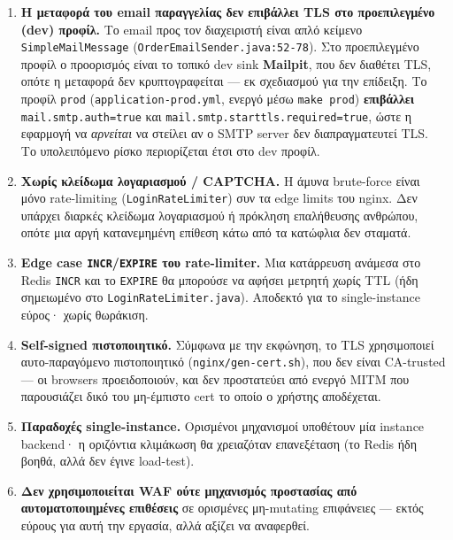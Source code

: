 \documentclass[11pt,a4paper]{article}
\newcommand{\code}[1]{\texttt{#1}}
\begin{document}
\begin{enumerate}[leftmargin=2em]\setlength\itemsep{3pt}
    \item \textbf{Η μεταφορά του email παραγγελίας δεν επιβάλλει TLS στο προεπιλεγμένο (dev) προφίλ.} Το
          email προς τον διαχειριστή είναι απλό κείμενο \code{SimpleMailMessage}
          (\code{OrderEmailSender.java:52-78}). Στο προεπιλεγμένο προφίλ ο προορισμός είναι το τοπικό
          dev sink \textbf{Mailpit}, που δεν διαθέτει TLS, οπότε η μεταφορά δεν κρυπτογραφείται ---
          εκ σχεδιασμού για την επίδειξη. Το προφίλ \code{prod} (\code{application-prod.yml}, ενεργό
          μέσω \code{make prod}) \textbf{επιβάλλει} \code{mail.smtp.auth=true} και
          \code{mail.smtp.starttls.required=true}, ώστε η εφαρμογή να \emph{αρνείται} να στείλει αν ο
          SMTP server δεν διαπραγματευτεί TLS. Το υπολειπόμενο ρίσκο περιορίζεται έτσι στο dev προφίλ.
    \item \textbf{Χωρίς κλείδωμα λογαριασμού / CAPTCHA.} Η άμυνα brute-force είναι μόνο rate-limiting
          (\code{LoginRateLimiter}) συν τα edge limits του nginx. Δεν υπάρχει διαρκές κλείδωμα
          λογαριασμού ή πρόκληση επαλήθευσης ανθρώπου, οπότε μια αργή κατανεμημένη επίθεση κάτω από τα
          κατώφλια δεν σταματά.
    \item \textbf{Edge case \code{INCR}/\code{EXPIRE} του rate-limiter.} Μια κατάρρευση ανάμεσα στο
          Redis \code{INCR} και το \code{EXPIRE} θα μπορούσε να αφήσει μετρητή χωρίς TTL (ήδη σημειωμένο
          στο \code{LoginRateLimiter.java}). Αποδεκτό για το single-instance εύρος· χωρίς θωράκιση.
    \item \textbf{Self-signed πιστοποιητικό.} Σύμφωνα με την εκφώνηση, το TLS χρησιμοποιεί αυτο-παραγόμενο
          πιστοποιητικό (\code{nginx/gen-cert.sh}), που δεν είναι CA-trusted --- οι browsers
          προειδοποιούν, και δεν προστατεύει από ενεργό MITM που παρουσιάζει δικό του μη-έμπιστο cert το
          οποίο ο χρήστης αποδέχεται.
    \item \textbf{Παραδοχές single-instance.} Ορισμένοι μηχανισμοί υποθέτουν μία instance backend· η
          οριζόντια κλιμάκωση θα χρειαζόταν επανεξέταση (το Redis ήδη βοηθά, αλλά δεν έγινε load-test).
    \item \textbf{Δεν χρησιμοποιείται WAF ούτε μηχανισμός προστασίας από αυτοματοποιημένες επιθέσεις} σε
          ορισμένες μη-mutating επιφάνειες --- εκτός εύρους για αυτή την εργασία, αλλά αξίζει να αναφερθεί.
\end{enumerate}
\end{document}
